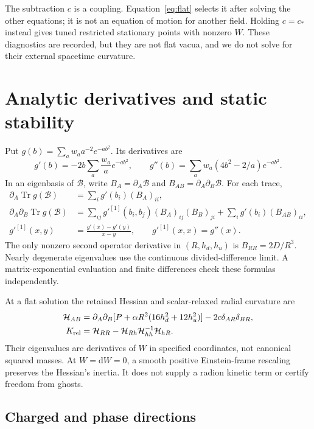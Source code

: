 \documentclass[11pt,letterpaper]{article}
\DeclareMathOperator{\Tr}{Tr}\DeclareMathOperator{\diag}{diag}
\newcommand{\dd}{\mathrm d}\newcommand{\Lam}{\Lambda}\newcommand{\B}{\mathcal B}\newcommand{\HH}{\mathcal H}
\begin{document}
The subtraction $c$ is a coupling. Equation~\eqref{eq:flat} selects it after solving the other equations; it is not an equation of motion for another field. Holding $c=c_*$ instead gives tuned restricted stationary points with nonzero $W$. These diagnostics are recorded, but they are not flat vacua, and we do not solve for their external spacetime curvature.

\section{Analytic derivatives and static stability}

Put $g(b)=\sum_a w_a a^{-2}e^{-ab^2}$. Its derivatives are
\begin{equation}
 g'(b)=-2b\sum_a\frac{w_a}{a}e^{-ab^2},\qquad
 g''(b)=\sum_aw_a(4b^2-2/a)e^{-ab^2}.
\end{equation}
In an eigenbasis of $\B$, write $B_A=\partial_A\B$ and $B_{AB}=\partial_A\partial_B\B$. For each trace,
\begin{align}
 \partial_A\Tr g(\B)&=\sum_i g'(b_i)(B_A)_{ii},\\
 \partial_A\partial_B\Tr g(\B)
 &=\sum_{ij}g'^{[1]}(b_i,b_j)(B_A)_{ij}(B_B)_{ji}
   +\sum_i g'(b_i)(B_{AB})_{ii},\\
 g'^{[1]}(x,y)&=\frac{g'(x)-g'(y)}{x-y},\qquad g'^{[1]}(x,x)=g''(x).
 \label{eq:derivatives}
\end{align}
The only nonzero second operator derivative in $(R,h_d,h_u)$ is $B_{RR}=2D/R^3$. Nearly degenerate eigenvalues use the continuous divided-difference limit. A matrix-exponential evaluation and finite differences check these formulas independently.

At a flat solution the retained Hessian and scalar-relaxed radial curvature are
\begin{align}
 \HH_{AB}&=\partial_A\partial_B[P+\alpha R^2(16h_d^2+12h_u^2)]-2c\delta_{AR}\delta_{BR},\\
 K_{\rm rel}&=\HH_{RR}-\HH_{Rh}\HH_{hh}^{-1}\HH_{hR}.
 \label{eq:schur}
\end{align}
Their eigenvalues are derivatives of $W$ in specified coordinates, not canonical squared masses. At $W=\dd W=0$, a smooth positive Einstein-frame rescaling preserves the Hessian's inertia. It does not supply a radion kinetic term or certify freedom from ghosts.

\subsection{Charged and phase directions}
\end{document}
